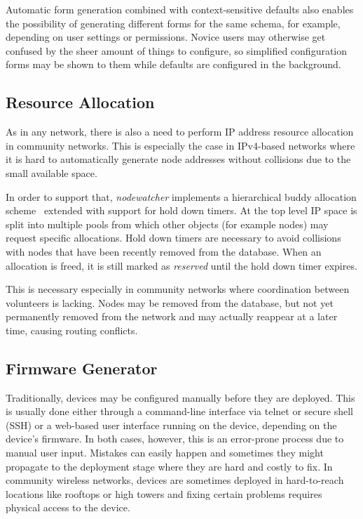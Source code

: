 \documentclass[5p,sort&compress]{elsarticle}
\newcommand{\nodewatcher}{\textit{nodewatcher}}
\begin{document}
Automatic form generation combined with context-sensitive defaults also enables the possibility of generating different forms for the same schema, for example, depending on user settings or permissions.
Novice users may otherwise get confused by the sheer amount of things to configure, so simplified configuration forms may be shown to them while defaults are configured in the background.

\subsection{Resource Allocation}

As in any network, there is also a need to perform IP address resource allocation in community networks.
This is especially the case in IPv4-based networks where it is hard to automatically generate node addresses without collisions due to the small available space.

In order to support that, \nodewatcher{} implements a hierarchical buddy allocation scheme~\cite{Peterson_1977} extended with support for hold down timers.
At the top level IP space is split into multiple pools from which other objects (for example nodes) may request specific allocations.
Hold down timers are necessary to avoid collisions with nodes that have been recently removed from the database.
When an allocation is freed, it is still marked as \textit{reserved} until the hold down timer expires.

This is necessary especially in community networks where coordination between volunteers is lacking.
Nodes may be removed from the database, but not yet permanently removed from the network and may actually reappear at a later time, causing routing conflicts.

\subsection{Firmware Generator}
\label{sec:firmware-generator}

Traditionally, devices may be configured manually before they are deployed.
This is usually done either through a command-line interface via telnet or secure shell (SSH) or a web-based user interface running on the device, depending on the device's firmware.
In both cases, however, this is an error-prone process due to manual user input.
Mistakes can easily happen and sometimes they might propagate to the deployment stage where they are hard and costly to fix.
In community wireless networks, devices are sometimes deployed in hard-to-reach locations like rooftops or high towers and fixing certain problems requires physical access to the device.
\end{document}
